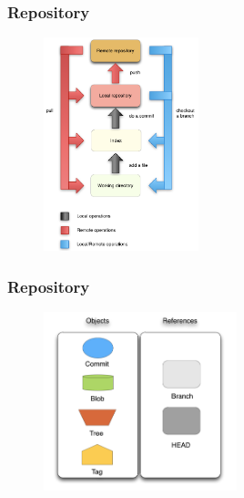 \documentclass{beamer}
\begin{document}
\begin{frame}
   \frametitle{Repository}
   \begin{figure}
      \centering
      \includegraphics[width=0.4\textwidth]{images/workflow2.png}
   \end{figure}
\end{frame}

\begin{frame}
\frametitle{Repository}
   \begin{figure}
      \centering
      \includegraphics[width=0.5\textwidth]{images/legenda2.png}
   \end{figure}
\end{frame}
\end{document}
